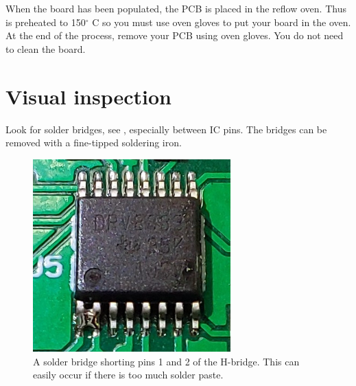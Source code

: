 When the board has been populated, the PCB is placed in the reflow
oven.  Thus is preheated to 150$^{\circ}$ C so you must use oven gloves to
put your board in the oven.  At the end of the process, remove your
PCB using oven gloves.  You do not need to clean the board.


\section{Visual inspection}

Look for solder bridges, see , especially
between IC pins.  The bridges can be removed with a fine-tipped
soldering iron.

\begin{figure}[!h]
  \centering
  \includegraphics[width=3in]{figs/solder_bridge_zoom.jpg}
  \caption{A solder bridge shorting pins 1 and 2 of the H-bridge.
    This can easily occur if there is too much solder paste.}
  \label{fig:solder-bridge}
\end{figure}

